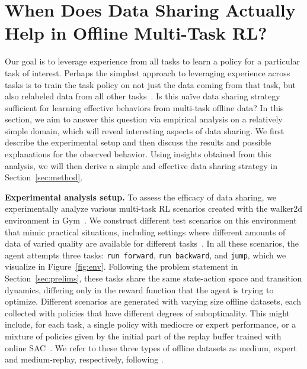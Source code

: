 \section{When Does Data Sharing Actually Help in Offline Multi-Task RL?}
\label{sec:analysis}

Our goal is to leverage experience from all tasks to learn a policy for a particular task of interest. Perhaps the simplest approach to leveraging experience across tasks is to train the task policy on not just the data coming from that task, but also relabeled data from all other tasks~\citep{caruana1997multitask}.
Is this na\"ive data sharing strategy sufficient for learning effective behaviors from multi-task offline data? In this section, we aim to answer this question via empirical analysis on a relatively simple domain, which will reveal interesting aspects of data sharing. We first describe the experimental setup and then discuss the results and possible explanations for the observed behavior. Using insights obtained from this analysis, we will then derive a simple and effective data sharing strategy in Section~\ref{sec:method}.

\textbf{Experimental analysis setup.} To assess the efficacy of data sharing, we experimentally analyze various multi-task RL scenarios created with the walker2d environment in Gym~\citep{brockman2016openai}. We construct different test scenarios on this environment that mimic practical situations, including settings where different amounts of  data of varied quality are available for different tasks~\citep{kalashnikov2021mt,xie2019improvisation,singh2020parrot}. In all these scenarios, the agent attempts three tasks: \texttt{run forward}, \texttt{run backward}, and \texttt{jump}, which we visualize in Figure~\ref{fig:env}. Following the problem statement in Section~\ref{sec:prelims}, these tasks share the same state-action space and transition dynamics, differing only in the reward function that the agent is trying to optimize. 
Different scenarios are generated with varying size offline datasets, each collected with policies that have different degrees of suboptimality. This might include, for each task, a single policy with mediocre or expert performance, or a mixture of policies given by the initial part of the replay buffer trained with online SAC~\citep{haarnoja2018soft}. We refer to these three types of offline datasets as medium, expert and medium-replay, respectively, following \citet{fu2020d4rl}.

